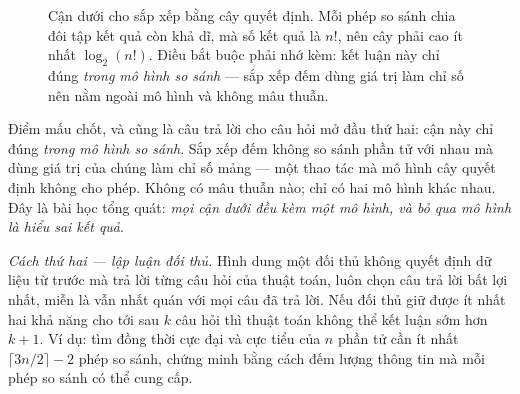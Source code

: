 \documentclass[../../algorithm.tex]{subfiles}
\begin{document}
\begin{figure}[H]\centering
{}
\caption{Cận dưới cho sắp xếp bằng cây quyết định. Mỗi phép so sánh chia đôi tập kết quả còn khả dĩ, mà số kết quả là \(n!\), nên cây phải cao ít nhất \(\log_2(n!)\). Điều bắt buộc phải nhớ kèm: kết luận này chỉ đúng \emph{trong mô hình so sánh} --- sắp xếp đếm dùng giá trị làm chỉ số nên nằm ngoài mô hình và không mâu thuẫn.}
\label{fig:decision-tree}
\end{figure}

Điểm mấu chốt, và cũng là câu trả lời cho câu hỏi mở đầu thứ hai: cận này chỉ đúng \emph{trong mô hình so sánh}. Sắp xếp đếm không so sánh phần tử với nhau mà dùng giá trị của chúng làm chỉ số mảng --- một thao tác mà mô hình cây quyết định không cho phép. Không có mâu thuẫn nào; chỉ có hai mô hình khác nhau. Đây là bài học tổng quát: \emph{mọi cận dưới đều kèm một mô hình, và bỏ qua mô hình là hiểu sai kết quả}.

\emph{Cách thứ hai --- lập luận đối thủ.} Hình dung một đối thủ không quyết định dữ liệu từ trước mà trả lời từng câu hỏi của thuật toán, luôn chọn câu trả lời bất lợi nhất, miễn là vẫn nhất quán với mọi câu đã trả lời. Nếu đối thủ giữ được ít nhất hai khả năng cho tới sau \(k\) câu hỏi thì thuật toán không thể kết luận sớm hơn \(k+1\). Ví dụ: tìm đồng thời cực đại và cực tiểu của \(n\) phần tử cần ít nhất \(\lceil 3n/2 \rceil - 2\) phép so sánh, chứng minh bằng cách đếm lượng thông tin mà mỗi phép so sánh có thể cung cấp.
\end{document}
